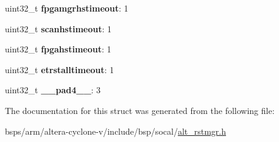 \begin{DoxyCompactItemize}
\item 
\mbox{\label{structALT__RSTMGR__STAT__s_a689e8c1d3822e5d3d8a302c29440ad7b}} 
uint32\+\_\+t {\bfseries fpgamgrhstimeout}\+: 1
\item 
\mbox{\label{structALT__RSTMGR__STAT__s_ab7872be4b38199376e4622ca91c532cc}} 
uint32\+\_\+t {\bfseries scanhstimeout}\+: 1
\item 
\mbox{\label{structALT__RSTMGR__STAT__s_a1bdc756af3b3cf229b15325b5aa25e2e}} 
uint32\+\_\+t {\bfseries fpgahstimeout}\+: 1
\item 
\mbox{\label{structALT__RSTMGR__STAT__s_aeb17d2fc347d07a440a5e09ad4885f12}} 
uint32\+\_\+t {\bfseries etrstalltimeout}\+: 1
\item 
\mbox{\label{structALT__RSTMGR__STAT__s_a32bbe96d54883f44e8c9bcb46aedddac}} 
uint32\+\_\+t {\bfseries \+\_\+\+\_\+pad4\+\_\+\+\_\+}\+: 3
\end{DoxyCompactItemize}


The documentation for this struct was generated from the following file\+:\begin{DoxyCompactItemize}
\item 
bsps/arm/altera-\/cyclone-\/v/include/bsp/socal/\mbox{\hyperlink{alt__rstmgr_8h}{alt\+\_\+rstmgr.\+h}}\end{DoxyCompactItemize}
